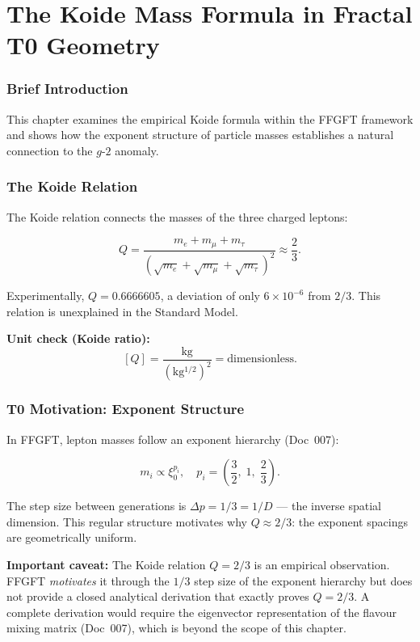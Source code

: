 
	
	\chapter{The Koide Mass Formula in Fractal T0 Geometry}
	
	\subsection*{Brief Introduction}
	
	This chapter examines the empirical Koide formula within the FFGFT framework and shows how the exponent structure of particle masses establishes a natural connection to the \(g\)-\(2\) anomaly.
	
	\subsection*{The Koide Relation}
	
	The Koide relation connects the masses of the three charged leptons:
	
	\begin{equation}
		Q = \frac{m_e + m_\mu + m_\tau}{(\sqrt{m_e} + \sqrt{m_\mu} + \sqrt{m_\tau})^2} \approx \frac{2}{3}.
	\end{equation}
	
	Experimentally, \(Q = 0.6666605\), a deviation of only \(6 \times 10^{-6}\) from \(2/3\). This relation is unexplained in the Standard Model.
	
	\textbf{Unit check (Koide ratio):}
	\[
	[Q] = \frac{\si{\kilo\gram}}{(\si{\kilo\gram^{1/2}})^2} = \text{dimensionless}.
	\]
	
	\subsection*{T0 Motivation: Exponent Structure}
	
	In FFGFT, lepton masses follow an exponent hierarchy (Doc~007):
	
	\begin{equation}
		m_i \propto \xi_0^{p_i}, \quad p_i = \left(\frac{3}{2},\; 1,\; \frac{2}{3}\right).
	\end{equation}
	
	The step size between generations is \(\Delta p = 1/3 = 1/D\) — the inverse spatial dimension. This regular structure motivates why \(Q \approx 2/3\): the exponent spacings are geometrically uniform.
	
	\textbf{Important caveat:} The Koide relation \(Q = 2/3\) is an empirical observation. FFGFT \emph{motivates} it through the \(1/3\) step size of the exponent hierarchy but does not provide a closed analytical derivation that exactly proves \(Q = 2/3\). A complete derivation would require the eigenvector representation of the flavour mixing matrix (Doc~007), which is beyond the scope of this chapter.
	
